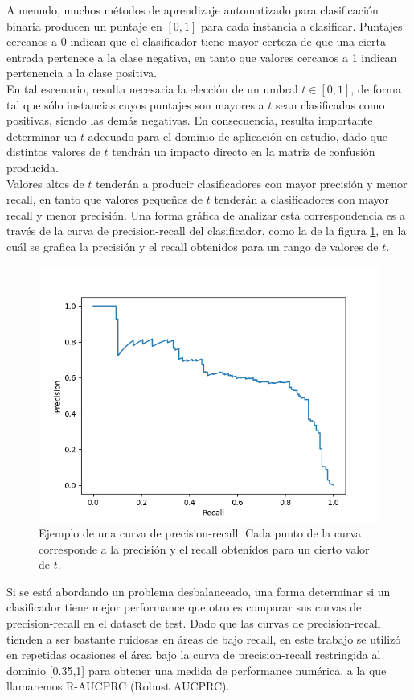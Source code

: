 A menudo, muchos métodos de aprendizaje automatizado para clasificación binaria producen un puntaje en $[0,1]$ para cada instancia a clasificar. Puntajes cercanos a 0 indican que el clasificador tiene mayor certeza de que una cierta entrada pertenece a la clase negativa, en tanto que valores cercanos a 1 indican pertenencia a la clase positiva. \\

En tal escenario, resulta necesaria la elección de un umbral $t \in [0,1]$, de forma tal que sólo instancias cuyos puntajes son mayores a $t$ sean clasificadas como positivas, siendo las demás negativas. En consecuencia, resulta importante determinar un $t$ adecuado para el dominio de aplicación en estudio, dado que distintos valores de $t$ tendrán un impacto directo en la matriz de confusión producida. \\

Valores altos de $t$ tenderán a producir clasificadores con mayor precisión y menor recall, en tanto que valores pequeños de $t$ tenderán a clasificadores con mayor recall y menor precisión. Una forma gráfica de analizar esta correspondencia es a través de la curva de precision-recall del clasificador, como la de la figura \ref{fig:prc}, en la cuál se grafica la precisión y el recall obtenidos para un rango de valores de $t$. \\

\begin{figure}[h]
\begin{center}
\includegraphics[width=.6\textwidth]{Kap1/PRc.png}
\end{center}
\caption[short]{Ejemplo de una curva de precision-recall. Cada punto de la curva corresponde a la precisión y el recall obtenidos para un cierto valor de $t$. }
\label{fig:prc}
\end{figure}

Si se está abordando un problema desbalanceado, una forma determinar si un clasificador tiene mejor performance que otro es comparar sus curvas de precision-recall en el dataset de test. Dado que las curvas de precision-recall tienden a ser bastante ruidosas en áreas de bajo recall, en este trabajo se utilizó en repetidas ocasiones el área bajo la curva de precision-recall restringida al dominio [0.35,1] para obtener una medida de performance numérica, a la que llamaremos R-AUCPRC (Robust AUCPRC).\\


